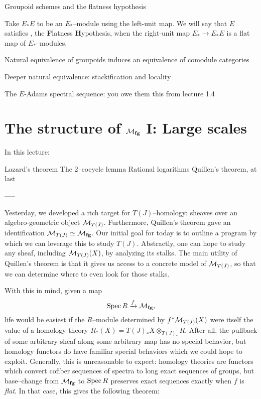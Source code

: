 Groupoid schemes and the flatness hypothesis

\begin{definition}
Take $E_* E$ to be an $E_*$--module using the left-unit map.  We will say that $E$ satisfies \FH, the \textbf Flatness \textbf Hypothesis, when the right-unit map $E_* \to E_* E$ is a flat map of $E_*$--modules.
\end{definition}




Natural equivalence of groupoids induces an equivalence of comodule categories

Deeper natural equivalence: stackification and locality

The $E$-Adams spectral sequence: you owe them this from lecture 1.4






\section{The structure of $\mathcal{M}_{\mathbf{fg}}$ I: Large scales}


In this lecture:

Lazard's theorem
The 2--cocycle lemma
Rational logarithms
Quillen's theorem, at last

-----

Yesterday, we developed a rich target for $T(J)$--homology: sheaves over an algebro-geometric object $\mathcal{M}_{T(J)}$.  Furthermore, Quillen's theorem gave an identification $\mathcal{M}_{T(J)} \simeq \mathcal{M}_{\mathbf{fg}}$.  Our initial goal for today is to outline a program by which we can leverage this to study $T(J)$.  Abstractly, one can hope to study any sheaf, including $\mathcal{M}_{T(J)}(X)$, by analyzing its stalks.  The main utility of Quillen's theorem is that it gives us access to a concrete model of $\mathcal{M}_{T(J)}$, so that we can determine where to even look for those stalks.

With this in mind, given a map \[\operatorname{Spec} R \xrightarrow{f} \mathcal{M}_{\mathbf{fg}},\] life would be easiest if the $R$--module determined by $f^* \mathcal{M}_{T(J)}(X)$ were itself the value of a homology theory $R_*(X) = T(J)_* X \otimes_{T(J)_*} R$.  After all, the pullback of some arbitrary sheaf along some arbitrary map has no special behavior, but homology functors do have familiar special behaviors which we could hope to exploit.  Generally, this is unreasonable to expect: homology theories are functors which convert cofiber sequences of spectra to long exact sequences of groups, but base--change from $\mathcal{M}_{\mathbf{fg}}$ to $\operatorname{Spec} R$ preserves exact sequences exactly when $f$ is \textit{flat}.  In that case, this gives the following theorem:

